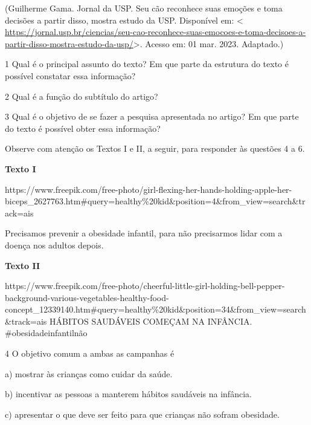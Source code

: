 {(Guilherme Gama. Jornal da USP. Seu cão reconhece suas emoções e toma
decisões a partir disso, mostra estudo da USP. Disponível em:
\textless{}
\url{https://jornal.usp.br/ciencias/seu-cao-reconhece-suas-emocoes-e-toma-decisoes-a-partir-disso-mostra-estudo-da-usp/}\textgreater.
Acesso em: 01 mar. 2023. Adaptado.)

\num{1} Qual é o principal assunto do texto? Em que parte da estrutura
do texto é possível constatar essa informação?


\num{2} Qual é a função do subtítulo do artigo?


\num{3} Qual é o objetivo de se fazer a pesquisa apresentada no artigo?
Em que parte do texto é possível obter essa informação?


Observe com atenção os Textos I e II, a seguir, para responder às
questões 4 a 6.

\textbf{Texto I}

https://www.freepik.com/free-photo/girl-flexing-her-hands-holding-apple-her-biceps\_2627763.htm\#query=healthy\%20kid\&position=4\&from\_view=search\&track=ais

Precisamos prevenir a obesidade infantil, para não precisarmos lidar com
a doença nos adultos depois.

\textbf{Texto II}

https://www.freepik.com/free-photo/cheerful-little-girl-holding-bell-pepper-background-various-vegetables-healthy-food-concept\_12339140.htm\#query=healthy\%20kid\&position=34\&from\_view=search\&track=ais
HÁBITOS SAUDÁVEIS COMEÇAM NA INFÂNCIA. \#obesidadeinfantilnão

\num{4} O objetivo comum a ambas as campanhas é

a) mostrar às crianças como cuidar da saúde.

b) incentivar as pessoas a manterem hábitos saudáveis na infância.

c) apresentar o que deve ser feito para que crianças não sofram
obesidade.

}
